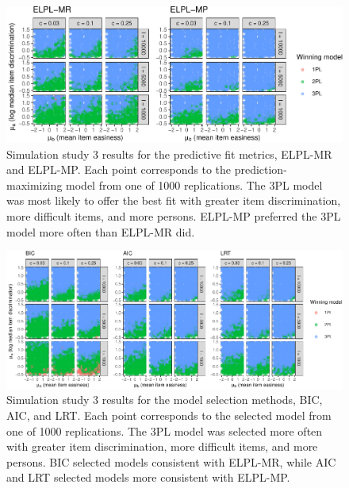 \documentclass[
  english,
  man,floatsintext]{apa7}
\begin{document}
\begin{figure}

{\centering \includegraphics[width=2100px]{irt-predictive-fit-apa_files/figure-latex/results5b1-1} 

}

\caption{Simulation study 3 results for the predictive fit metrics, ELPL-MR and ELPL-MP. Each point corresponds to the prediction-maximizing model from one of 1000 replications. The 3PL model was most likely to offer the best fit with greater item discrimination, more difficult items, and more persons. ELPL-MP preferred the 3PL model more often than ELPL-MR did.}\label{fig:results5b1}
\end{figure}

\begin{figure}

{\centering \includegraphics[width=2100px]{irt-predictive-fit-apa_files/figure-latex/results5b2-1} 

}

\caption{Simulation study 3 results for the model selection methods, BIC, AIC, and LRT. Each point corresponds to the selected model from one of 1000 replications. The 3PL model was selected more often with greater item discrimination, more difficult items, and more persons. BIC selected models consistent with ELPL-MR, while AIC and LRT selected models more consistent with ELPL-MP.}\label{fig:results5b2}
\end{figure}
\end{document}
